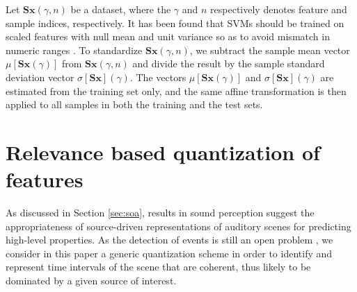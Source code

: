 \documentclass[journal]{IEEEtran}
\begin{document}
Let $\mathbf{S}\boldsymbol{x}(\gamma,n)$ be a dataset, where the $\gamma$ and $n$ respectively denotes feature and sample indices, respectively.
It has been found that SVMs should be trained on scaled features with null mean and unit variance so as to avoid mismatch in numeric ranges \cite{Hsu2003}.
To standardize $\mathbf{S}\boldsymbol{x}(\gamma,n)$, we subtract the sample mean vector $\mu[\mathbf{S}\boldsymbol{x}(\gamma)]$ from $\mathbf{S}\boldsymbol{x}(\gamma,n)$ and divide the result by the sample standard deviation vector $\sigma[\mathbf{S}\boldsymbol{x}] (\gamma)$.
The vectors $\mu[\mathbf{S}\boldsymbol{x}(\gamma)]$ and $\sigma[\mathbf{S}\boldsymbol{x}](\gamma)$ are estimated from the training set only, and the same affine transformation is then applied to all samples in both the training and the test sets.

\section{Relevance based quantization of features}
\label{sec:object}



As discussed in Section \ref{sec:soa}, results in sound perception suggest the appropriateness of source-driven representations of auditory scenes for predicting high-level properties. As the detection of events is still an open problem \cite{7100934}, we consider in this paper a generic quantization scheme in order to identify and represent time intervals of the scene that are coherent, thus likely to be dominated by a given source of interest.
\end{document}
